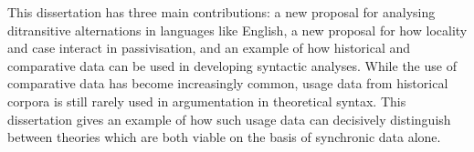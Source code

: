 This dissertation has three main contributions: a new proposal for analysing ditransitive alternations in languages like English, a new proposal for how locality and case interact in passivisation, and an example of how historical and comparative data can be used in developing syntactic analyses. While the use of comparative data has become increasingly common, usage data from historical corpora is still rarely used in argumentation in theoretical syntax. This dissertation gives an example of how such usage data can decisively distinguish between theories which are both viable on the basis of synchronic data alone.
